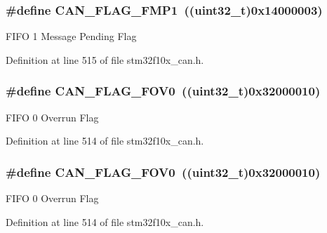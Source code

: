 \subsubsection[{\texorpdfstring{C\+A\+N\+\_\+\+F\+L\+A\+G\+\_\+\+F\+M\+P1}{CAN_FLAG_FMP1}}]{\setlength{\rightskip}{0pt plus 5cm}\#define C\+A\+N\+\_\+\+F\+L\+A\+G\+\_\+\+F\+M\+P1~(({\bf uint32\+\_\+t})0x14000003)}\hypertarget{group___c_a_n__flags_ga5d4b7376954a059fbd74ed8d688f6657}{}\label{group___c_a_n__flags_ga5d4b7376954a059fbd74ed8d688f6657}
F\+I\+FO 1 Message Pending Flag 

Definition at line 515 of file stm32f10x\+\_\+can.\+h.

\subsubsection[{\texorpdfstring{C\+A\+N\+\_\+\+F\+L\+A\+G\+\_\+\+F\+O\+V0}{CAN_FLAG_FOV0}}]{\setlength{\rightskip}{0pt plus 5cm}\#define C\+A\+N\+\_\+\+F\+L\+A\+G\+\_\+\+F\+O\+V0~(({\bf uint32\+\_\+t})0x32000010)}\hypertarget{group___c_a_n__flags_ga2abd66b5e0032132673208decd2d01f2}{}\label{group___c_a_n__flags_ga2abd66b5e0032132673208decd2d01f2}
F\+I\+FO 0 Overrun Flag 

Definition at line 514 of file stm32f10x\+\_\+can.\+h.

\subsubsection[{\texorpdfstring{C\+A\+N\+\_\+\+F\+L\+A\+G\+\_\+\+F\+O\+V0}{CAN_FLAG_FOV0}}]{\setlength{\rightskip}{0pt plus 5cm}\#define C\+A\+N\+\_\+\+F\+L\+A\+G\+\_\+\+F\+O\+V0~(({\bf uint32\+\_\+t})0x32000010)}\hypertarget{group___c_a_n__flags_ga2abd66b5e0032132673208decd2d01f2}{}\label{group___c_a_n__flags_ga2abd66b5e0032132673208decd2d01f2}
F\+I\+FO 0 Overrun Flag 

Definition at line 514 of file stm32f10x\+\_\+can.\+h.

